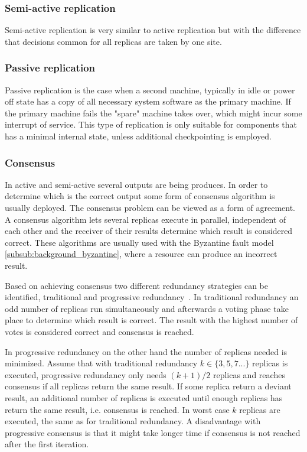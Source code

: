 \documentclass{cslthse-msc}
\begin{document}
\subsubsection{Semi-active replication} \label{subsec:semi_active_replication}
Semi-active replication is very similar to active replication but with the difference that decisions common for all replicas are taken by one site.

\subsubsection{Passive replication} \label{subsec:passive_replication}
Passive replication is the case when a second machine, typically in idle or power off state has a copy of all necessary system software as the primary machine. If the primary machine fails the "spare" machine takes over, which might incur some interrupt of service. This type of replication is only suitable for components that has a minimal internal state, unless additional checkpointing is employed.

\subsubsection{Consensus} \label{subsub:consensus}
In active and semi-active several outputs are being produces. In order to determine which is the correct output some form of consensus algorithm is usually deployed. The consensus problem can be viewed as a form of agreement. A consensus algorithm lets several replicas execute in parallel, independent of each other and the receiver of their results determine which result is considered correct. These algorithms are usually used with the Byzantine fault model \cref{subsub:background_byzantine}, where a resource can produce an incorrect result.

Based on achieving consensus two different redundancy strategies can be identified, traditional and progressive redundancy~\cite{selfAdaptRel}. In traditional redundancy an odd number of replicas run simultaneously and afterwards a voting phase take place to determine which result is correct. The result with the highest number of votes is considered correct and consensus is reached.

In progressive redundancy on the other hand the number of replicas needed is minimized. Assume that with traditional redundancy $k \in \{3,5,7...\}$ replicas is executed, progressive redundancy only needs $(k+1)/2$ replicas and reaches consensus if all replicas return the same result. If some replica return a deviant result, an additional number of replicas is executed until enough replicas has return the same result, i.e. consensus is reached. In worst case $k$ replicas are executed, the same as for traditional redundancy. A disadvantage with progressive consensus is that it might take longer time if consensus is not reached after the first iteration.
\end{document}
